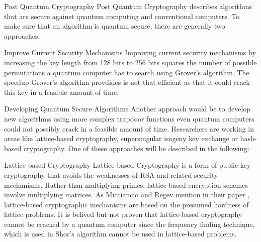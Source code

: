 \documentclass[aps,preprintnumbers,twocolumn]{revtex4}
\begin{document}
\begin{section}{Post Quantum Cryptography}
Post Quantum Cryptography describes algorithms that are secure against quantum computing and conventional computers. To make sure that an algorithm is quantum secure, there are generally two approaches: 
\begin{subsection}{Improve Current Security Mechanisms}    
Improving current security mechanisms by increasing the key length from 128 bits to 256 bits squares the number of possible permutations a quantum computer has to search using Grover's algorithm. 
The speedup Grover's algorithm provdides is not that efficient as that it could crack this key in a feasible amount of time.
\end{subsection}

\begin{subsection}{Developing Quantum Secure Algorithms}
Another approach would be to develop new algorithms using more complex trapdoor functions even quantum computers could not possibly crack in a feasible amount of time. 
Researchers are working in areas like lattice-based cryptography, supersingular isogeny key exchange or hash-based cryptography. One of these approaches will be described in the following: 

\begin{subsubsection}{Lattice-based Cryptography}
Lattice-based Cryptography is a form of public-key cryptography that avoids the weaknesses of RSA and related security mechanisms. 
Rather than multiplying primes, lattice-based encryption schemes involve multiplying matrices. 
As Micciancio and Regev mention in their paper \cite[p.2]{Micciancio2009}, 
lattice-based cryptographic mechanisms are based on the presumed hardness of lattice problems. It is belived but not proven that lattice-based cryptography cannot be cracked by a quantum computer since the frequency finding technique,
which is used in Shor's algorithm cannot be used in lattice-based problems. 
\end{subsubsection}

\end{subsection}


\end{section}
\end{document}
